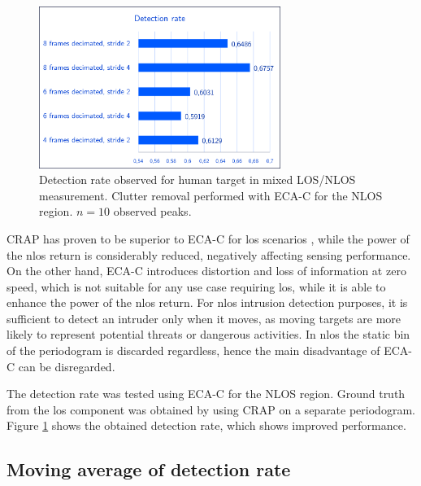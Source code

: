 \begin{figure}[H]
	\centering
	\includegraphics[width=0.7\textwidth]{Images/Test1/detect_hist/detect_hist_human_ECAC_LMsans.png}
	\caption{\small Detection rate observed for human target in mixed LOS/NLOS measurement. Clutter removal performed with ECA-C for the NLOS region. $n=10$ observed peaks.}
	\label{fig:Test1_detect_hist_crap-ecac}
\end{figure}
CRAP has proven to be superior to ECA-C for \gls{los} scenarios \cite{Henninger_CRAP_2023}, while the power of the \gls{nlos} return is considerably reduced, negatively affecting sensing performance.
On the other hand, ECA-C introduces distortion and loss of information at zero speed, which is not suitable for any use case requiring \gls{los}, while it is able to enhance the power of the \gls{nlos} return. For \gls{nlos} intrusion detection purposes, it is sufficient to detect an intruder only when it moves, as moving targets are more likely to represent potential threats or dangerous activities.
In \gls{nlos} the static bin of the periodogram is discarded regardless, hence the main disadvantage of ECA-C can be disregarded.

The detection rate was tested using ECA-C for the NLOS region.
Ground truth from the \gls{los} component was obtained by using CRAP on a separate periodogram.
Figure \ref{fig:Test1_detect_hist_crap-ecac} shows the obtained detection rate, which shows improved performance.


\subsection{Moving average of detection rate}

